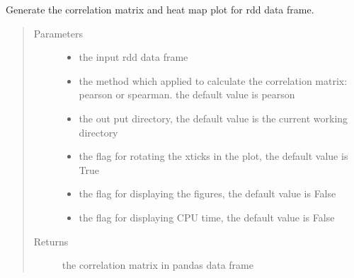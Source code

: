 \documentclass[letterpaper,12pt,english]{sphinxmanual}
\begin{document}
\begin{fulllineitems}
Generate the correlation matrix and heat map plot for rdd data frame.
\begin{quote}\begin{description}
\item[{Parameters}] \leavevmode\begin{itemize}
\item {} 
 \textendash{} the input rdd data frame

\item {} 
 \textendash{} the method which applied to calculate the correlation matrix: pearson or spearman.
the default value is pearson

\item {} 
 \textendash{} the out put directory, the default value is the current working directory

\item {} 
 \textendash{} the flag for rotating the xticks in the plot, the default value is True

\item {} 
 \textendash{} the flag for displaying the figures, the default value is False

\item {} 
 \textendash{} the flag for displaying CPU time, the default value is False

\end{itemize}

\item[{Returns}] \leavevmode
the correlation matrix in pandas data frame

\end{description}\end{quote}


\end{fulllineitems}
\end{document}
